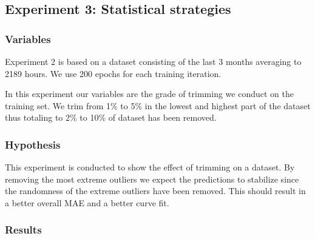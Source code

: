 \subsection{Experiment 3: Statistical strategies}

\subsubsection{Variables}
Experiment 2 is based on a dataset consisting of the last 3 months averaging to 2189 hours. We use 200 epochs for each training iteration.

In this experiment our variables are the grade of trimming we conduct on the training set. We trim from 1\% to 5\% in the lowest and highest part of the dataset thus totaling to 2\% to 10\% of dataset has been removed.

\subsubsection{Hypothesis}
This experiment is conducted to show the effect of trimming on a dataset. By removing the most extreme outliers we expect the predictions to stabilize since the randomness of the extreme outliers have been removed. This should result in a better overall MAE and a better curve fit.

\subsubsection{Results}

\begin{table}[H]
\centering  %
\caption{Trims} %
\label{table:Top10Trimming} %
\end{table}

